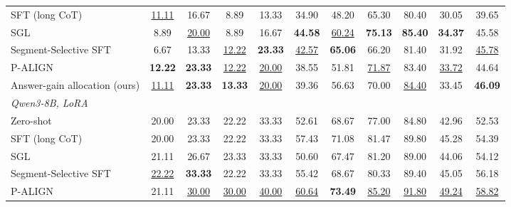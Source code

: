 \documentclass[11pt]{article}
\newcommand{\uniformpalign}{P-ALIGN}
\begin{document}
\begin{table}[t]
\begin{tabular}{lcccccccccc}
    SFT (long CoT)
    & \underline{11.11} & 16.67
    & 8.89 & 13.33
    & 34.90 & 48.20
    & 65.30 & 80.40
    & 30.05 & 39.65 \\

    SGL \citep{fan2026sgl}
    & 8.89 & \underline{20.00}
    & 8.89 & 16.67
    & \textbf{44.58} & \underline{60.24}
    & \textbf{75.13} & \textbf{85.40}
    & \textbf{34.37} & 45.58 \\

    Segment-Selective SFT \citep{wang2026segattr}
    & 6.67 & 13.33
    & \underline{12.22} & \textbf{23.33}
    & \underline{42.57} & \textbf{65.06}
    & 66.20 & 81.40
    & 31.92 & \underline{45.78} \\

    \uniformpalign{}
    & \textbf{12.22} & \textbf{23.33}
    & \underline{12.22} & \underline{20.00}
    & 38.55 & 51.81
    & \underline{71.87} & 83.40
    & \underline{33.72} & 44.64 \\

    Answer-gain allocation (ours)
    & \underline{11.11} & \textbf{23.33}
    & \textbf{13.33} & \underline{20.00}
    & 39.36 & 56.63
    & 70.00 & \underline{84.40}
    & 33.45 & \textbf{46.09} \\

    \midrule
    \multicolumn{11}{l}{\textit{Qwen3-8B, LoRA}} \\

    Zero-shot
    & 20.00 & 23.33
    & 22.22 & 33.33
    & 52.61 & 68.67
    & 77.00 & 84.80
    & 42.96 & 52.53 \\

    SFT (long CoT)
    & 20.00 & 23.33
    & 22.22 & 33.33
    & 57.43 & 71.08
    & 81.47 & 89.80
    & 45.28 & 54.39 \\

    SGL \citep{fan2026sgl}
    & 21.11 & 26.67
    & 23.33 & 33.33
    & 50.60 & 67.47
    & 81.20 & 89.00
    & 44.06 & 54.12 \\

    Segment-Selective SFT \citep{wang2026segattr}
    & \underline{22.22} & \textbf{33.33}
    & 22.22 & 33.33
    & 55.42 & 68.67
    & 80.33 & 89.40
    & 45.05 & 56.18 \\

    \uniformpalign{}
    & 21.11 & \underline{30.00}
    & \underline{30.00} & \underline{40.00}
    & \underline{60.64} & \textbf{73.49}
    & \underline{85.20} & \underline{91.80}
    & \underline{49.24} & \underline{58.82} \\


\end{tabular}
\end{table}
\end{document}
